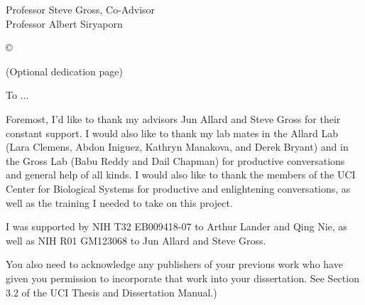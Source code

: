 




\othercommitteemembers
{
  Professor Steve Gross, Co-Advisor\\
  Professor Albert Siryaporn
}


\copyrightdeclaration
{
  {\copyright} {\Degreeyear} \Authorname
}


\dedications
{
  (Optional dedication page)
  
  To ...
}

\acknowledgments
{
Foremost, I'd like to thank my advisors Jun Allard and Steve Gross for their constant support. I would also like to thank my lab mates in the Allard Lab (Lara Clemens, Abdon Iniguez, Kathryn Manakova, and Derek Bryant) and in the Gross Lab (Babu Reddy and Dail Chapman) for productive conversations and general help of all kinds. I would also like to thank the members of the UCI Center for Biological Systems for productive and enlightening conversations, as well as the training I needed to take on this project.

I was supported by NIH T32 EB009418-07 to Arthur Lander and Qing Nie, as well as NIH R01 GM123068 to Jun Allard and Steve Gross.
  
  You also need to acknowledge any publishers of your previous
  work who have given you permission to incorporate that work
  into your dissertation. See Section 3.2 of the UCI Thesis and
  Dissertation Manual.)
}


